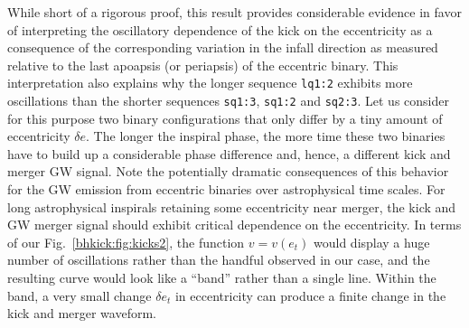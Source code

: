 While short of a rigorous proof, this result provides considerable
evidence in favor of interpreting the oscillatory dependence of the
kick on the eccentricity as a consequence of the corresponding
variation in the infall direction as measured relative to the last
apoapsis (or periapsis) of the eccentric binary. This interpretation
also explains why the longer sequence \texttt{lq1:2} exhibits more
oscillations than the shorter sequences \texttt{sq1:3}, \texttt{sq1:2}
and \texttt{sq2:3}. Let us consider for this purpose two binary
configurations that only differ by a tiny amount of eccentricity
$\delta e$. The longer the inspiral phase, the more time these two
binaries have to build up a considerable phase difference and, hence,
a different kick and merger GW signal. Note the potentially dramatic
consequences of this behavior for the GW emission from eccentric
binaries over astrophysical time scales. For long astrophysical
inspirals retaining some eccentricity near merger,
the kick and GW merger signal should exhibit critical dependence on
the eccentricity. In terms of our Fig.~\ref{bhkick:fig:kicks2}, the function
$v=v(e_t)$ would display a huge number of oscillations rather than the
handful observed in our case, and the resulting curve would look like
a ``band'' rather than a single line. Within the band, a very small
change $\delta e_t$ in eccentricity can produce a finite change in the
kick and merger waveform.

